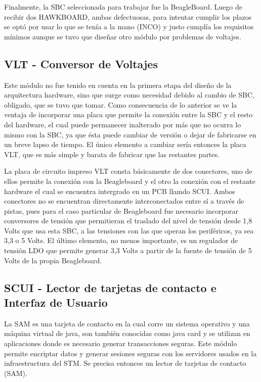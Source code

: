 Finalmente, la SBC seleccionada para trabajar fue la BeagleBoard. Luego de recibir dos HAWKBOARD, ambas defectuosas, para intentar cumplir los plazos se optó por usar lo que se tenía a la mano (INCO) y justo cumplía los requisitos mínimos aunque se tuvo que diseñar otro módulo por problemas de voltajes.

\subsection{VLT - Conversor de Voltajes}
Este módulo no fue tenido en cuenta en la primera etapa del diseño de la arquitectura hardware, sino que surge como necesidad debido al cambio de SBC, obligado, que se tuvo que tomar. Como consecuencia de lo anterior se ve la ventaja de incorporar una placa que permite la conexión entre la SBC y el resto del hardware, el cual puede permanecer inalterado por más que no ocurra lo mismo con la SBC, ya que ésta puede cambiar de versión o dejar de fabricarse en un breve lapso de tiempo. El único elemento a cambiar sería entonces la placa VLT, que es más simple y barata de fabricar que las restantes partes.


La placa de circuito impreso VLT consta básicamente de dos conectores, uno de ellos permite la conexión con la Beagleboard y el otro la conexión con el restante hardware el cual se encuentra intergrado en un PCB llamdo SCUI. Ambos conectores no se encuentran directamente interconectados entre sí a través de pistas, pues para el caso particular de Beagleboard fue necesario incorporar conversores de tensión que permitieran el traslado del nivel de tensión desde 1,8 Volts que usa esta SBC, a las tensiones con las que operan los periféricos, ya sea 3,3 o 5 Volts.
El último elemento, no menos importante, es un regulador de tensión LDO que permite generar 3,3 Volts a partir de la fuente de tensión de 5 Volts de la propia Beagleboard.

\subsection{SCUI - Lector de tarjetas de contacto e Interfaz de Usuario}
La SAM es una tarjeta de contacto en la cual corre un sistema operativo y una máquina virtual de java, son también conocidas como java card y se utilizan en aplicaciones donde es necesario generar transacciones seguras. Este módulo permite encriptar datos y generar sesiones seguras con los servidores usados en la infraestructura del STM. Se precisa entonces un lector de tarjetas de contacto (SAM).


